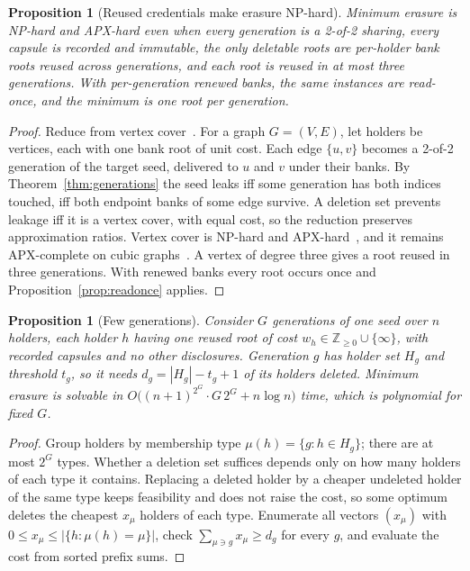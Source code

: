 \documentclass[pdflatex,sn-mathphys-num]{sn-jnl}
\theoremstyle{plain}
\newtheorem{proposition}[theorem]{Proposition}
\theoremstyle{definition}
\begin{document}
\begin{proposition}[Reused credentials make erasure NP-hard]\label{prop:hard}
Minimum erasure is NP-hard and APX-hard even when every generation is a 2-of-2 sharing, every capsule is recorded and immutable, the only deletable roots are per-holder bank roots reused across generations, and each root is reused in at most three generations. With per-generation renewed banks, the same instances are read-once, and the minimum is one root per generation.
\end{proposition}
\begin{proof}
Reduce from vertex cover~\cite{karp1972}. For a graph $G=(V,E)$, let holders be vertices, each with one bank root of unit cost. Each edge $\{u,v\}$ becomes a 2-of-2 generation of the target seed, delivered to $u$ and $v$ under their banks. By Theorem~\ref{thm:generations} the seed leaks iff some generation has both indices touched, iff both endpoint banks of some edge survive. A deletion set prevents leakage iff it is a vertex cover, with equal cost, so the reduction preserves approximation ratios. Vertex cover is NP-hard and APX-hard~\cite{karp1972,dinur2005}, and it remains APX-complete on cubic graphs~\cite{alimonti2000}. A vertex of degree three gives a root reused in three generations. With renewed banks every root occurs once and Proposition~\ref{prop:readonce} applies.
\end{proof}

\begin{proposition}[Few generations]\label{prop:fewgen}
Consider $G$ generations of one seed over $n$ holders, each holder $h$ having one reused root of cost $w_h\in\mathbb{Z}_{\ge0}\cup\{\infty\}$, with recorded capsules and no other disclosures. Generation $g$ has holder set $H_g$ and threshold $t_g$, so it needs $d_g=|H_g|-t_g+1$ of its holders deleted. Minimum erasure is solvable in $O\big((n+1)^{2^G}\cdot G\,2^G+n\log n\big)$ time, which is polynomial for fixed $G$.
\end{proposition}
\begin{proof}
Group holders by membership type $\mu(h)=\{g:h\in H_g\}$; there are at most $2^G$ types. Whether a deletion set suffices depends only on how many holders of each type it contains. Replacing a deleted holder by a cheaper undeleted holder of the same type keeps feasibility and does not raise the cost, so some optimum deletes the cheapest $x_\mu$ holders of each type. Enumerate all vectors $(x_\mu)$ with $0\le x_\mu\le|\{h:\mu(h)=\mu\}|$, check $\sum_{\mu\ni g}x_\mu\ge d_g$ for every $g$, and evaluate the cost from sorted prefix sums.
\end{proof}
\end{document}
